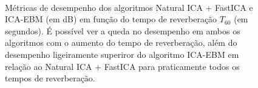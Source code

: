     \begin{figure}
        \centering
        \\
        \caption{Métricas de desempenho dos algoritmos Natural ICA + FastICA e ICA-EBM (em dB) em função do tempo de reverberação $T_{60}$ (em segundos). É possível ver a queda no desempenho em ambos os algoritmos com o aumento do tempo de reverberação, além do desempenho ligeiramente superiror do algoritmo ICA-EBM em relação ao Natural ICA + FastICA para praticamente todos os tempos de reverberação.}
        \label{fig:reverb_estimative}
    \end{figure}

